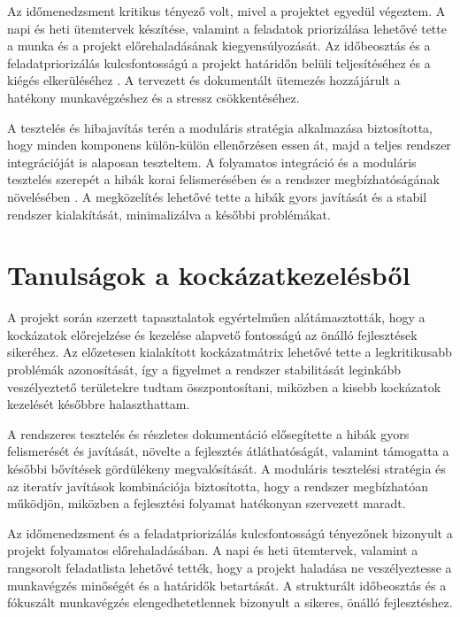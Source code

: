 Az időmenedzsment kritikus tényező volt, mivel a projektet egyedül végeztem. 
A napi és heti ütemtervek készítése, valamint a feladatok priorizálása lehetővé tette a munka és a projekt előrehaladásának kiegyensúlyozását. 
Az időbeosztás és a feladatpriorizálás kulcsfontosságú a 
projekt határidőn belüli teljesítéséhez és a kiégés elkerüléséhez \cite{Kovacs2016,Hajdu2014}. 
A tervezett és dokumentált ütemezés hozzájárult a hatékony munkavégzéshez és a stressz csökkentéséhez.

A tesztelés és hibajavítás terén a moduláris stratégia alkalmazása biztosította, 
hogy minden komponens külön-külön ellenőrzésen essen át, majd a teljes rendszer integrációját is alaposan teszteltem. 
A folyamatos integráció és a moduláris tesztelés szerepét 
a hibák korai felismerésében és a rendszer megbízhatóságának növelésében \cite{Szalay2018,Kaposi2019}. 
A megközelítés lehetővé tette a hibák gyors javítását és a stabil rendszer kialakítását, minimalizálva a későbbi problémákat.

\section{Tanulságok a kockázatkezelésből}

A projekt során szerzett tapasztalatok egyértelműen alátámasztották, hogy a kockázatok előrejelzése 
és kezelése alapvető fontosságú az önálló fejlesztések sikeréhez.  
Az előzetesen kialakított kockázatmátrix lehetővé tette a legkritikusabb problémák azonosítását, 
így a figyelmet a rendszer stabilitását leginkább veszélyeztető területekre tudtam összpontosítani, 
miközben a kisebb kockázatok kezelését későbbre halaszthattam.  

A rendszeres tesztelés és részletes dokumentáció elősegítette a hibák gyors felismerését és 
javítását, növelte a fejlesztés átláthatóságát, valamint támogatta a későbbi bővítések gördülékeny megvalósítását.  
A moduláris tesztelési stratégia és az iteratív javítások kombinációja biztosította, hogy a 
rendszer megbízhatóan működjön, miközben a fejlesztési folyamat hatékonyan szervezett maradt.

Az időmenedzsment és a feladatpriorizálás kulcsfontosságú tényezőnek bizonyult a projekt folyamatos előrehaladásában.  
A napi és heti ütemtervek, valamint a rangsorolt feladatlista lehetővé tették, hogy a projekt 
haladása ne veszélyeztesse a munkavégzés minőségét és a határidők betartását.  
A strukturált időbeosztás és a fókuszált munkavégzés elengedhetetlennek bizonyult a sikeres, önálló fejlesztéshez.
